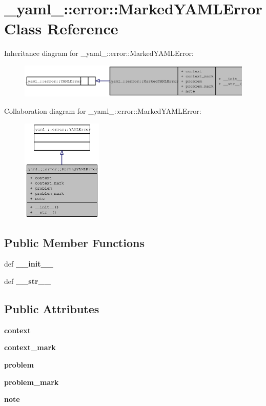 \section{\_\-yaml\_\-::error::MarkedYAMLError Class Reference}
\label{class__yaml___1_1error_1_1MarkedYAMLError}
Inheritance diagram for \_\-yaml\_\-::error::MarkedYAMLError:\nopagebreak
\begin{figure}[H]
\begin{center}
\leavevmode
\includegraphics[width=400pt]{class__yaml___1_1error_1_1MarkedYAMLError__inherit__graph}
\end{center}
\end{figure}
Collaboration diagram for \_\-yaml\_\-::error::MarkedYAMLError:\nopagebreak
\begin{figure}[H]
\begin{center}
\leavevmode
\includegraphics[width=109pt]{class__yaml___1_1error_1_1MarkedYAMLError__coll__graph}
\end{center}
\end{figure}
\subsection*{Public Member Functions}
\begin{CompactItemize}
\item 
def {\bf \_\-\_\-init\_\-\_\-}
\item 
def {\bf \_\-\_\-str\_\-\_\-}
\end{CompactItemize}
\subsection*{Public Attributes}
\begin{CompactItemize}
\item 
{\bf context}
\item 
{\bf context\_\-mark}
\item 
{\bf problem}
\item 
{\bf problem\_\-mark}
\item 
{\bf note}
\end{CompactItemize}


